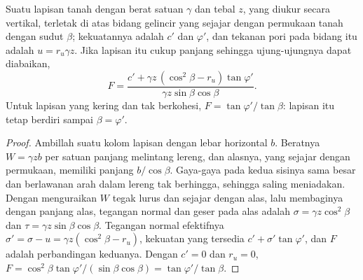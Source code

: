 \begin{proposition}\label{prop:b2:geological-hazards:infinite-slope}
Suatu lapisan tanah dengan berat satuan $\gamma$ dan tebal $z$, yang diukur secara vertikal, terletak di atas bidang
gelincir yang sejajar dengan permukaan tanah dengan sudut $\beta$; kekuatannya adalah $c'$ dan $\varphi'$, dan
tekanan pori pada bidang itu adalah $u = r_u \gamma z$. Jika lapisan itu cukup panjang sehingga ujung-ujungnya dapat
diabaikan,
\begin{equation}
F = \frac{c' + \gamma z\,(\cos^2\beta - r_u)\tan\varphi'}{\gamma z \sin\beta\cos\beta}.
\label{eq:b2:geological-hazards:infinite-slope}
\end{equation}
Untuk lapisan yang kering dan tak berkohesi, $F = \tan\varphi'/\tan\beta$: lapisan itu tetap berdiri sampai $\beta = \varphi'$.
\end{proposition}

\begin{proof}
Ambillah suatu kolom lapisan dengan lebar horizontal $b$. Beratnya $W = \gamma z b$ per satuan panjang
melintang lereng, dan alasnya, yang sejajar dengan permukaan, memiliki panjang $b/\cos\beta$. Gaya-gaya pada
kedua sisinya sama besar dan berlawanan arah dalam lereng tak berhingga, sehingga saling meniadakan. Dengan menguraikan $W$ tegak lurus dan
sejajar dengan alas, lalu membaginya dengan panjang alas, tegangan normal dan geser pada alas adalah
$\sigma = \gamma z\cos^2\beta$ dan $\tau = \gamma z \sin\beta\cos\beta$. Tegangan normal
efektifnya $\sigma' = \sigma - u = \gamma z(\cos^2\beta - r_u)$, kekuatan yang tersedia $c' +
\sigma'\tan\varphi'$, dan $F$ adalah perbandingan keduanya. Dengan $c' = 0$ dan $r_u = 0$, $F = \cos^2\beta
\tan\varphi'/(\sin\beta\cos\beta) = \tan\varphi'/\tan\beta$.
\end{proof}

